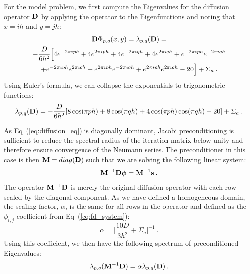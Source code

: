 \documentclass{mc2013}
\begin{document}
For the model problem, we first compute the Eigenvalues for the
diffusion operator $\mathbf{D}$ by applying the operator to the
Eigenfunctions and noting that $x=ih$ and $y=jh$:
\begin{multline}
  \mathbf{D}\Phi_{p,q}(x,y) = \lambda_{p,q}(\mathbf{D})
  =\\ -\frac{D}{6h^2}\Big[4 e^{-2 \pi \imath p h} + 4 e^{2 \pi \imath
      p h} + 4 e^{-2 \pi \imath q h} + 4 e^{2 \pi \imath q h} + e^{-2
      \pi \imath p h} e^{-2 \pi \imath q h} \\ + e^{-2 \pi \imath p h}
    e^{2 \pi \imath q h} + e^{2 \pi \imath p h} e^{-2 \pi \imath q h}
    + e^{2 \pi \imath p h} e^{2 \pi \imath q h} - 20\Big] + \Sigma_a
  \:.
  \label{eq:deriv_diff_1}
\end{multline}
Using Euler's formula, we can collapse the exponentials to
trigonometric functions:
\begin{equation}
  \lambda_{p,q}(\mathbf{D}) = -\frac{D}{6h^2}[ 8 \cos(\pi p h) + 8
    \cos(\pi q h) + 4 \cos(\pi p h) \cos(\pi q h) - 20] + \Sigma_a\:.
  \label{eq:deriv_diff_2}
\end{equation}

As Eq~(\ref{eq:diffusion_eq}) is diagonally dominant, Jacobi
preconditioning is sufficient to reduce the spectral radius of the
iteration matrix below unity and therefore ensure convergence of the
Neumann series. The preconditioner in this case is then $\mathbf{M} =
diag(\mathbf{D})$ such that we are solving the following linear system:
\begin{equation}
  \mathbf{M}^{-1} \mathbf{D} \boldsymbol{\phi} = \mathbf{M}^{-1} \mathbf{s}\:.
  \label{eq:precond_diffsion}
\end{equation}
The operator $\mathbf{M}^{-1} \mathbf{D}$ is merely the original diffusion
operator with each row scaled by the diagonal component. As we have
defined a homogeneous domain, the scaling factor, $\alpha$, is the
same for all rows in the operator and defined as the $\phi_{i,j}$
coefficient from Eq~(\ref{eq:fd_system}):
\begin{equation}
  \alpha = \Bigg[\frac{10 D}{3 h^2} + \Sigma_a\Bigg]^{-1}\:.
  \label{eq:jacobi_scaling}
\end{equation}
Using this coefficient, we then have the following spectrum of
preconditioned Eigenvalues:
\begin{equation}
  \lambda_{p,q}(\mathbf{M}^{-1} \mathbf{D}) = \alpha \lambda_{p,q}(\mathbf{D})\:.
  \label{eq:preconditioned_Eigenvalues}
\end{equation}
\end{document}

